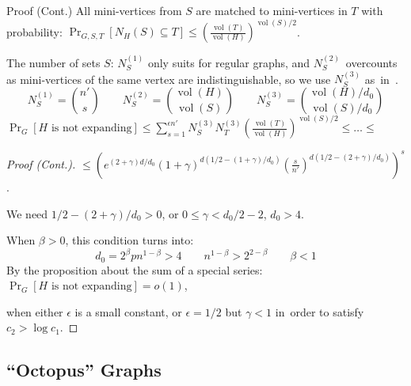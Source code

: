 \documentclass{beamer}
\DeclareMathOperator*{\vol}{vol}
\newcommand{\autotitle}{\secname\ifdefempty{\subsecname}{}{~--- \subsecname}}
\newcommand{\smalldisplayskips}{
    \setlength{\abovedisplayskip}{3pt}
    \setlength{\belowdisplayskip}{3pt}}
\begin{document}
\begin{frame}{\autotitle}
    \smalldisplayskips
    \begin{block}{Proof (Cont.)}
        All mini-vertices from $S$ are matched to mini-vertices in $T$ with probability:
        $\Pr_{G,S,T}[N_H(S)\subseteq T]\leq\left(\frac{\vol(T)}{\vol(H)}\right)^{\vol(S)/2}$.

        The number of sets $S$:
        $N_S^{(1)}$ only suits for regular graphs, and
        $N_S^{(2)}$~overcounts as mini-vertices of the same vertex are indistinguishable,
        so we use $N_S^{(3)}$ as~in~\cite{gms03}.
        \begin{equation*}
            N_S^{(1)}=\binom{n'}{s}
            \qquad N_S^{(2)}=\binom{\vol(H)}{\vol(S)}
            \qquad N_S^{(3)}=\binom{\vol(H)/d_0}{\vol(S)/d_0}
        \end{equation*}
        $\Pr_G[H\text{ is not expanding}]
        \leq\sum_{s=1}^{\epsilon n'}{
            N_S^{(3)}
            N_T^{(3)}
            \left(\frac{\vol(T)}{\vol(H)}\right)^{\vol(S)/2}\leq\ldots\leq
        }$
    \end{block}
\end{frame}

\begin{frame}{\autotitle}
    \smalldisplayskips
    \begin{proof}[Proof (Cont.)]
        $\leq\left(
            e^{(2+\gamma)d/d_0}
            (1+\gamma)^{d(1/2-(1+\gamma)/d_0)}
            \left(\frac{s}{n'}\right)^{d(1/2-(2+\gamma)/d_0)}
        \right)^s$.
        
        We need $1/2-(2+\gamma)/d_0>0$, or $0\leq\gamma<d_0/2-2$, $d_0>4$.
        
        When $\beta>0$, this condition turns into:
        \begin{equation*}
            d_0=2^\beta pn^{1-\beta}>4
            \qquad n^{1-\beta}>2^{2-\beta}
            \qquad\beta<1
        \end{equation*}
        By the proposition about the sum of a special series:
        $\Pr_G[H\text{ is not expanding}]=o(1)$,
        
        when either $\epsilon$ is a small constant,
        or $\epsilon=1/2$ but $\gamma<1$ in~order to satisfy $c_2>\log c_1$.
    \end{proof}
\end{frame}

\subsection{\texorpdfstring{``Octopus''}{"Octopus"} Graphs}
\end{document}
